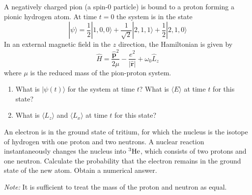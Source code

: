 \documentclass[11pt]{hmcpset}
\begin{document}


\begin{problem}
	
	A negatively charged pion (a spin-0 particle) is bound to a proton forming a pionic hydrogen atom. At time $t=0$ the system is in the state
	\[
	|\psi\rangle = \frac{1}{2} |1,0,0\rangle + \frac{1}{\sqrt{2}} |2,1,1\rangle + \frac{1}{2} |2,1,0\rangle
	\]
	In an external magnetic field in the $z$ direction, the Hamiltonian is given by
	\[
	\hat H = \frac{\mathbf{\hat p}^2}{2 \mu} - \frac{e^2}{|\mathbf{\hat r}|} + \omega_0 \hat L_z
	\]
	where $\mu$ is the reduced mass of the pion-proton system.
	
	\begin{enumerate}
		\item[(a)] What is $|\psi(t)\rangle $ for the system at time $t$? What is $\langle E \rangle$ at time $t$ for this state?
		
		\item[(b)] What is $\langle L_z \rangle$ and $\langle L_x \rangle$ at time $t$ for this state?
	\end{enumerate}
	
\end{problem}
\begin{solution}
	\vfill
\end{solution}
\pagebreak



\begin{problem}
	
	An electron is in the ground state of tritium, for which the
	nucleus is the isotope of hydrogen with one proton and two neutrons. A
	nuclear reaction instantaneously changes the nucleus into $^3{\rm{He}}$,
	which consists of two protons and one neutron. Calculate the probability
	that the electron remains in the ground state of the new atom. Obtain a
	numerical answer.
	
	\emph{Note:} It is sufficient to treat the mass of the proton and neutron as equal.
	
	
\end{problem}
\begin{solution}
	\vfill
\end{solution}
\pagebreak
\end{document}

